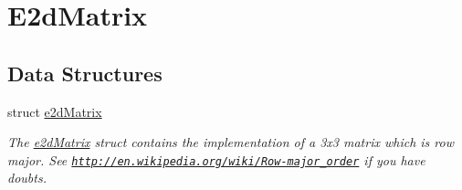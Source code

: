 \hypertarget{group__e2d_matrix}{\section{E2d\-Matrix}
\label{group__e2d_matrix}
}
\subsection*{Data Structures}
\begin{DoxyCompactItemize}
\item 
struct \hyperlink{structe2d_matrix}{e2d\-Matrix}
\begin{DoxyCompactList}\small\item\em The \hyperlink{structe2d_matrix}{e2d\-Matrix} struct contains the implementation of a 3x3 matrix which is row major. See \href{http://en.wikipedia.org/wiki/Row-major_order}{\tt http\-://en.\-wikipedia.\-org/wiki/\-Row-\/major\-\_\-order} if you have doubts. \end{DoxyCompactList}\end{DoxyCompactItemize}
